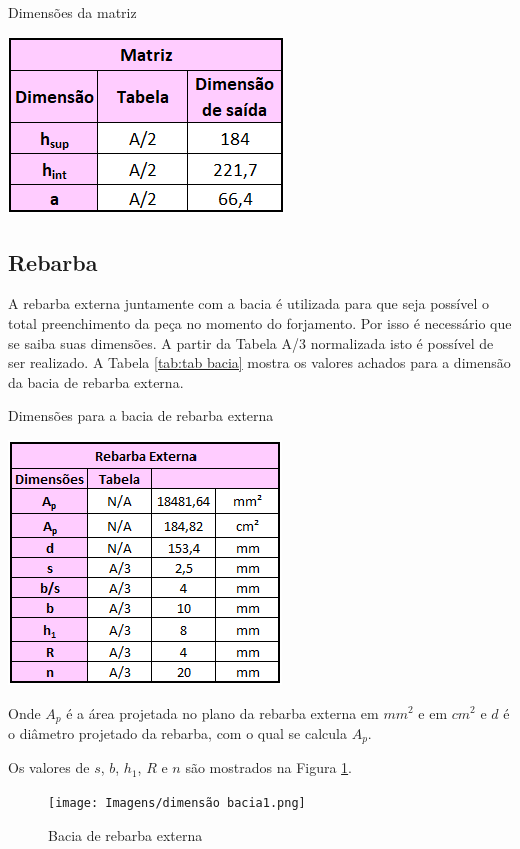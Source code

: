 \documentclass[deposito, acronym, symbols]{fei}
\begin{document}
 \begin{table}[!htb]
 \centering
    \caption{Dimensões da matriz}
    \includegraphics[width=0.3\linewidth]{Imagens/matrizes.png}
    \label{tab:tab matrizes}
 \end{table}
 

\subsection{Rebarba} \label{bacia}

A rebarba externa juntamente com a bacia é utilizada para que seja possível o total preenchimento da peça no momento do forjamento. Por isso é necessário que se saiba suas dimensões. A partir da Tabela A/3 normalizada isto é possível de ser realizado. A Tabela \ref{tab:tab bacia} mostra os valores achados para a dimensão da bacia de rebarba externa. 

\begin{table}[!htb]
 \centering
    \caption{Dimensões para a bacia de rebarba externa}
    \includegraphics[width=0.4\linewidth]{Imagens/rebarba externa.png}
    \label{tab:tab bacia}
 \end{table}

Onde $A_p$ é a área projetada no plano da rebarba externa em $mm^{2}$ e em $cm^{2}$ e $d$ é o diâmetro projetado da rebarba, com o qual se calcula $A_p$.

Os valores de $s$, $b$, $h_1$, $R$ e $n$ são mostrados na Figura \ref{fig:dimbacia}.

\begin{figure}[!htp]
    \centering
    \caption{Bacia de rebarba externa}
    \texttt{[image: Imagens/dimensão bacia1.png]}
    \label{fig:dimbacia}
\end{figure}
\end{document}
